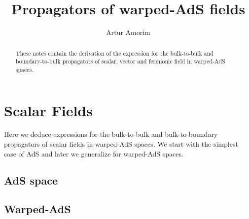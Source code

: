 \documentclass[12pt,a4paper]{article}
\begin{document}
\title{Propagators of warped-AdS fields}
\author{Artur Amorim}

\begin{abstract}
These notes contain the derivation of the expression for the bulk-to-bulk and boundary-to-bulk propagators of scalar, vector and fermionic field in warped-AdS spaces.
\end{abstract}
\maketitle

\section{Scalar Fields}
Here we deduce expressions for the bulk-to-bulk and bulk-to-boundary propagators of scalar fields in warped-AdS spaces. We start with the simplest case of AdS and later we generalize for warped-AdS spaces.
\subsection{AdS space}
\subsection{Warped-AdS}
\end{document}
